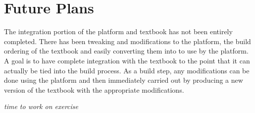 \section{Future Plans}

The integration portion of the platform and textbook has not been entirely completed. There has been tweaking and modifications to the platform, the build ordering of the textbook and easily converting them into to use by the platform. A goal is to have complete integration with the textbook to the point that it can actually be tied into the build process. As a build step, any modifications can be done using the platform and then immediately carried out by producing a new version of the textbook with the appropriate modifications.

\textit{time to work on exercise}
